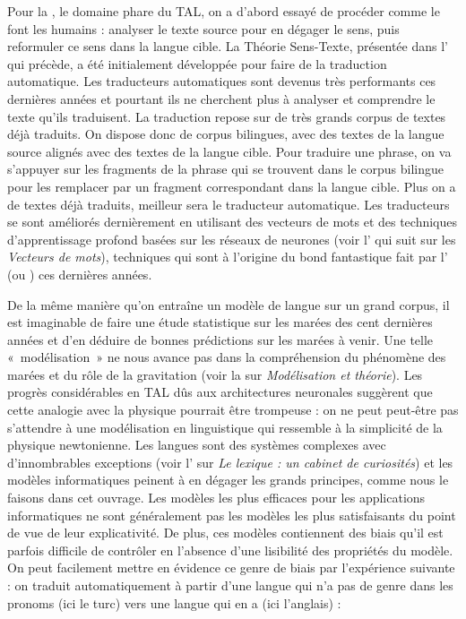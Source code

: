 Pour la , le domaine phare du TAL, on a d’abord essayé de procéder comme le font les humains : analyser le texte source pour en dégager le sens, puis reformuler ce sens dans la langue cible. La Théorie Sens-Texte, présentée dans l’ qui précède, a été initialement développée pour faire de la traduction automatique. Les traducteurs automatiques sont devenus très performants ces dernières années et pourtant ils ne cherchent plus à analyser et comprendre le texte qu’ils traduisent. La traduction repose sur de très grands corpus de textes déjà traduits. On dispose donc de corpus bilingues, avec des textes de la langue source alignés avec des textes de la langue cible. Pour traduire une phrase, on va s’appuyer sur les fragments de la phrase qui se trouvent dans le corpus bilingue pour les remplacer par un fragment correspondant dans la langue cible. Plus on a de textes déjà traduits, meilleur sera le traducteur automatique. Les traducteurs se sont améliorés dernièrement en utilisant des vecteurs de mots et des techniques d’apprentissage profond basées sur les réseaux de neurones (voir l’ qui suit sur les \textit{Vecteurs de mots}), techniques qui sont à l'origine du bond fantastique fait par l' (ou ) ces dernières années.

De la même manière qu'on entraîne un modèle de langue sur un grand corpus, il est imaginable de faire une étude statistique sur les marées des cent dernières années et d'en déduire de bonnes prédictions sur les marées à venir. Une telle «~modélisation~» ne nous avance pas dans la compréhension du phénomène des marées et du rôle de la gravitation (voir la  sur \textit{Modélisation et théorie}). Les progrès considérables en TAL dûs aux architectures neuronales suggèrent que cette analogie avec la physique pourrait être trompeuse : on ne peut peut-être pas s’attendre à une modélisation en linguistique qui ressemble à la simplicité de la physique newtonienne. Les langues sont des systèmes complexes avec d’innombrables exceptions (voir l’ sur \textit{Le lexique : un cabinet de curiosités}) et les modèles informatiques peinent à en dégager les grands principes, comme nous le faisons dans cet ouvrage. Les modèles les plus efficaces pour les applications informatiques ne sont généralement pas les modèles les plus satisfaisants du point de vue de leur explicativité. De plus, ces modèles contiennent des biais qu’il est parfois difficile de contrôler en l’absence d’une lisibilité des propriétés du modèle. On peut facilement mettre en évidence ce genre de biais par l’expérience suivante : on traduit automatiquement à partir d’une langue qui n’a pas de genre dans les pronoms  (ici le turc) vers une langue qui en a (ici l’anglais) :

